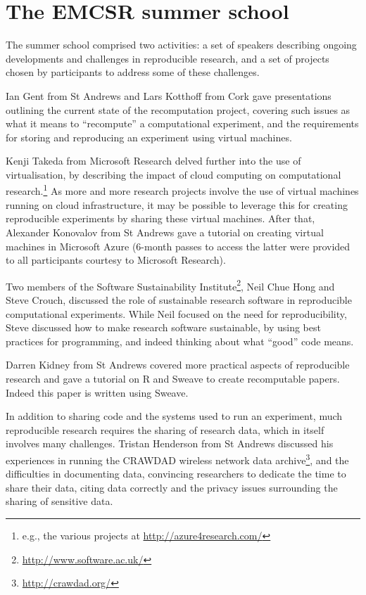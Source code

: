 \section{The EMCSR summer school}
\label{s:school}

The summer school comprised two activities: a set of speakers
describing ongoing developments and challenges in reproducible
research, and a set of projects chosen by participants to address some
of these challenges.

Ian Gent from St Andrews and Lars Kotthoff from Cork gave
presentations outlining the current state of the recomputation
project, covering such issues as what it means to ``recompute'' a
computational experiment, and the requirements for storing and
reproducing an experiment using virtual machines.

Kenji Takeda from Microsoft Research delved further into the use of
virtualisation, by describing the impact of cloud computing on
computational research.\footnote{e.g., the various projects at
\url{http://azure4research.com/}} As more and more research projects
involve the use of virtual machines running on cloud infrastructure,
it may be possible to leverage this for creating
reproducible experiments by sharing these virtual machines. After that,
Alexander Konovalov from St Andrews gave a tutorial on creating
virtual machines in Microsoft Azure (6-month passes to access the
latter were provided to all participants courtesy to Microsoft Research).

Two members of the Software Sustainability
Institute\footnote{\url{http://www.software.ac.uk/}}, Neil Chue Hong
and Steve Crouch, discussed the role of sustainable research software
in reproducible computational experiments. While Neil focused on the
need for reproducibility, Steve discussed how to make research
software sustainable, by using best practices for programming, and
indeed thinking about what ``good'' code means.

Darren Kidney from St Andrews covered more practical aspects of reproducible
research and gave a tutorial on R and Sweave to create
recomputable papers. Indeed this paper is written using Sweave.

In addition to sharing code and the systems used to run an experiment,
much reproducible research requires the sharing of research data,
which in itself involves many challenges. Tristan Henderson from St
Andrews discussed his experiences in running the CRAWDAD wireless
network data archive\footnote{\url{http://crawdad.org/}}, and the
difficulties in documenting data, convincing researchers to dedicate
the time to share their data, citing data correctly and the privacy
issues surrounding the sharing of sensitive data.

